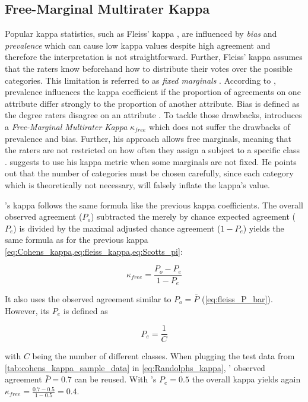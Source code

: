 \subsection{Free-Marginal Multirater Kappa}
\label{chp:fundamentals:sec:inter_rater_agreement:subsec:free_marginal_multirater_kappa}

Popular kappa statistics, such as Fleiss' kappa \parencite{Fleiss:1971}, are influenced by \textit{bias} and \textit{prevalence} which can cause low kappa values despite high agreement \parencite{Randolph:2005, Sim:2005} and therefore the interpretation is not straightforward.
Further, Fleiss' kappa assumes that the raters know beforehand how to distribute their votes over the possible categories.
This limitation is referred to as \textit{fixed marginals} \parencite{Brennan:1981}.
According to \textcite{Sim:2005}, prevalence influences the kappa coefficient if the proportion of agreements on one attribute differ strongly to the proportion of another attribute.
Bias is defined as the degree raters disagree on an attribute \parencite{Sim:2005}.
To tackle those drawbacks, \textcite{Randolph:2005} introduces a \textit{Free-Marginal Multirater Kappa} $\kappa_{free}$ which does not suffer the drawbacks of prevalence and bias.
Further, his approach allows free marginals, meaning that the raters are not restricted on how often they assign a subject to a specific class \parencite{Brennan:1981}.
\textcite{Randolph:2005} suggests to use his kappa metric when some marginals are not fixed.
He points out that the number of categories must be chosen carefully, since each category which is theoretically not necessary, will falsely inflate the kappa's value.

's kappa \parencite{Randolph:2005} follows the same formula like the previous kappa coefficients.
The overall observed agreement ($P_o$) subtracted the merely by chance expected agreement ($P_e$) is divided by the maximal adjusted chance agreement ($1-P_e$) yields the same formula as for the previous kappa \cref{eq:Cohens_kappa,eq:fleiss_kappa,eq:Scotts_pi}:

\begin{equation}\label{eq:Randolphs_kappa}
    \kappa_{free} = \frac{P_o - P_e}{1 - P_e}
\end{equation}

It also uses the observed agreement similar to \citeauthor{Fleiss:1971}  $P_o=\bar{P}$ (\cref{eq:fleiss_P_bar}).
However, its $P_e$ is defined as

\begin{equation}\label{eq:Randolphs_Pe}
P_e = \frac{1}{C}
\end{equation}

with $C$ being the number of different classes.
When plugging the test data from \cref{tab:cohens_kappa_sample_data} in \cref{eq:Randolphs_kappa}, \citeauthor{Fleiss:1971}' observed agreement $\bar{P} = 0.7$ can be reused.
With \citeauthor{Randolph:2005}'s $P_e = 0.5$ the overall kappa yields again $\kappa_{free} = \frac{0.7 - 0.5}{1 - 0.5} = 0.4$.
